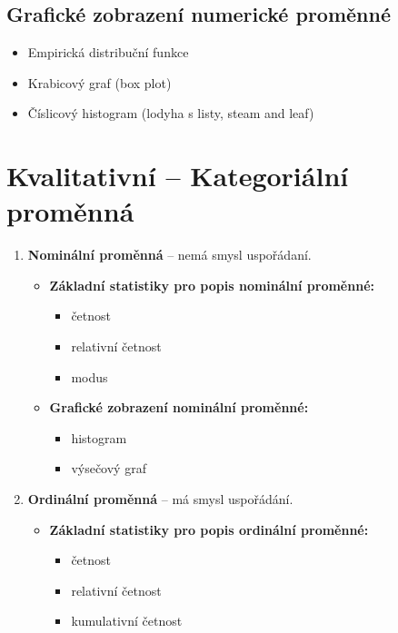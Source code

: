 \subsection{Grafické zobrazení numerické proměnné}
\begin{itemize}
    \item Empirická distribuční funkce
    \item Krabicový graf (box plot)
    \item Číslicový histogram (lodyha s listy, steam and leaf)
\end{itemize}

\section{Kvalitativní -- Kategoriální proměnná}
\begin{enumerate}
    \item \textbf{Nominální proměnná} -- nemá smysl uspořádaní.
          \begin{itemize}
              \item \textbf{Základní statistiky pro popis nominální proměnné:}
                    \begin{itemize}
                        \item četnost
                        \item relativní četnost
                        \item modus
                    \end{itemize}
              \item \textbf{Grafické zobrazení nominální proměnné:}
                    \begin{itemize}
                        \item histogram
                        \item výsečový graf
                    \end{itemize}
          \end{itemize}
    \item \textbf{Ordinální proměnná} -- má smysl uspořádání.
          \begin{itemize}
              \item \textbf{Základní statistiky pro popis ordinální proměnné:}
                    \begin{itemize}
                        \item četnost
                        \item relativní četnost
                        \item kumulativní četnost

\end{itemize}
\end{itemize}
\end{enumerate}
